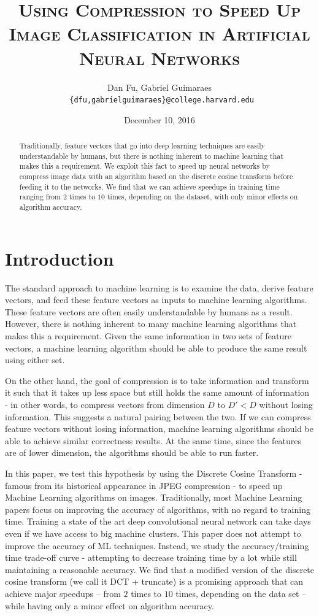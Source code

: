 \documentclass[12pt]{article}
\title{{\textsc{Using Compression to Speed Up Image Classification in Artificial Neural Networks}}}
\author{Dan Fu, Gabriel Guimaraes \\
{\small \texttt{ \{dfu,gabrielguimaraes\}@college.harvard.edu}}}
\date{December 10, 2016}
\begin{document}
\hypersetup{linkcolor = black}

\maketitle

\begin{abstract}
    Traditionally, feature vectors that go into deep learning techniques are easily understandable by humans, but there is nothing inherent to machine learning that makes this a requirement.  We exploit this fact to speed up neural networks by compress image data with an algorithm based on the discrete cosine transform before feeding it to the networks.  We find that we can achieve speedups in training time ranging from $2$ times to $10$ times, depending on the dataset, with only minor effects on algorithm accuracy.
\end{abstract}

\section{Introduction} \label{introduction}

The standard approach to machine learning is to examine the data, derive feature vectors, and feed these feature vectors as inputs to machine learning algorithms.  These feature vectors are often easily understandable by humans as a result.  However, there is nothing inherent to many machine learning algorithms that makes this a requirement.  Given the same information in two sets of feature vectors, a machine learning algorithm should be able to produce the same result using either set.

On the other hand, the goal of compression is to take information and transform it such that it takes up less space but still holds the same amount of information - in other words, to compress vectors from dimension $D$ to $D' < D$ without losing information.  This suggests a natural pairing between the two.  If we can compress feature vectors without losing information, machine learning algorithms should be able to achieve similar correctness results.  At the same time, since the features are of lower dimension, the algorithms should be able to run faster.

In this paper, we test this hypothesis by using the Discrete Cosine Transform - famous from its historical appearance in JPEG compression \cite{wallace} - to speed up Machine Learning algorithms on images.  Traditionally, most Machine Learning papers focus on improving the accuracy of algorithms, with no regard to training time. Training a state of the art deep convolutional neural network can take days even if we have access to big machine clusters. This paper does not attempt to improve the accuracy of ML techniques. Instead, we study the accuracy/training time trade-off curve - attempting to decrease training time by a lot while still maintaining a reasonable accuracy.  We find that a modified version of the discrete cosine transform (we call it DCT + truncate) is a promising approach that can achieve major speedups -- from $2$ times to $10$ times, depending on the data set -- while having only a minor effect on algorithm accuracy.
\end{document}
